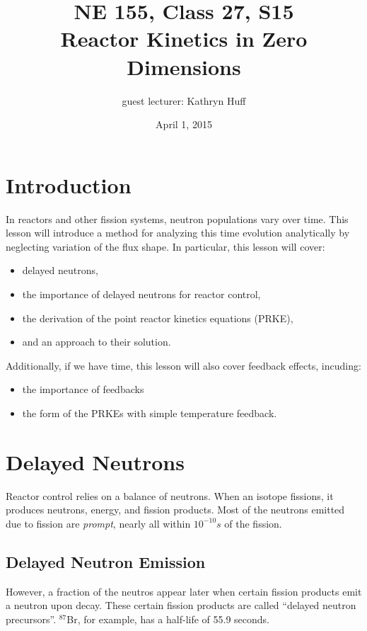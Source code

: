 \documentclass[12pt]{article}
\title{NE 155, Class 27, S15 \\
Reactor Kinetics in Zero Dimensions}
\date{April 1, 2015}
\begin{document}
\author{guest lecturer: Kathryn Huff}
\maketitle

\hrulefill

\section{Introduction}

In reactors and other fission systems, neutron populations vary over time. This 
lesson will introduce a method for analyzing this time evolution analytically 
by neglecting variation of the flux shape. In particular, this lesson will 
cover:

\begin{itemize}
\item delayed neutrons,
\item the importance of delayed neutrons for reactor control,
\item the derivation of the point reactor kinetics equations (PRKE),
\item and an approach to their solution.
\end{itemize}

Additionally, if we have time, this lesson will also cover feedback effects, 
incuding: 
\begin{itemize}
\item the importance of feedbacks
\item the form of the PRKEs with simple temperature feedback.
\end{itemize}


\section{Delayed Neutrons}
Reactor control relies on a balance of neutrons. When an isotope fissions, it 
produces neutrons, energy, and fission products.  Most of the neutrons emitted 
due to fission are \emph{prompt}, nearly all within $10^{-10}s$ of the fission. 

\subsection{Delayed Neutron Emission}
However, a fraction of the neutros appear later when certain fission products 
emit a neutron upon decay. These certain fission products are called ``delayed 
neutron precursors''.  $^{87}$Br, for example, has a half-life of 55.9 seconds.
\end{document}
